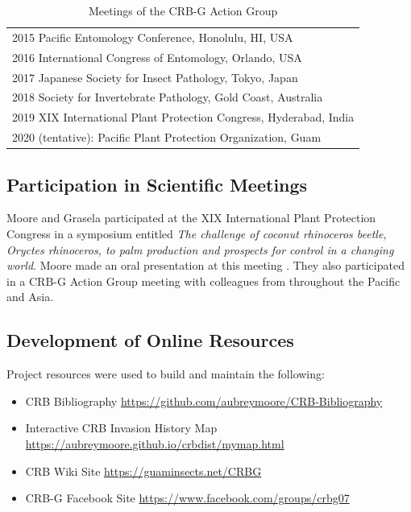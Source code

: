 \documentclass[12pt,
letterpaper,english,bibliography=totocnumbered, abstract=on]{scrartcl}
\begin{document}
\begin{table}[h]
	\centering
	\caption{Meetings of the CRB-G Action Group}
	\begin{tabular}{l}
		\toprule
		2015 Pacific Entomology Conference, Honolulu, HI, USA \\
		2016 International Congress of Entomology, Orlando, USA \\
		2017 Japanese Society for Insect Pathology, Tokyo, Japan \\
		2018 Society for Invertebrate Pathology, Gold Coast, Australia \\
		2019 XIX International Plant Protection Congress, Hyderabad, India \\
		2020 (tentative): Pacific Plant Protection Organization, Guam \\
		\bottomrule
	\end{tabular}
	\label{tab:action-group}
\end{table}	

\subsection{Participation in Scientific Meetings}

Moore and Grasela participated at the XIX International Plant Protection Congress in a symposium entitled \textit{The challenge of coconut rhinoceros beetle, Oryctes rhinoceros, to palm production and prospects for control in a changing world}. Moore made an oral presentation at this meeting \parencite{moore_status_2019}.
They also participated in a CRB-G Action Group meeting with colleagues from throughout the Pacific and Asia.

\subsection{Development of Online Resources}

Project resources were used to build and maintain the following:
\begin{itemize}
	\item CRB Bibliography \url{https://github.com/aubreymoore/CRB-Bibliography}
	\item Interactive CRB Invasion History Map	\url{https://aubreymoore.github.io/crbdist/mymap.html}
	\item CRB Wiki Site \url{https://guaminsects.net/CRBG}
	\item CRB-G Facebook Site \url{https://www.facebook.com/groups/crbg07} 
\end{itemize}
\end{document}
